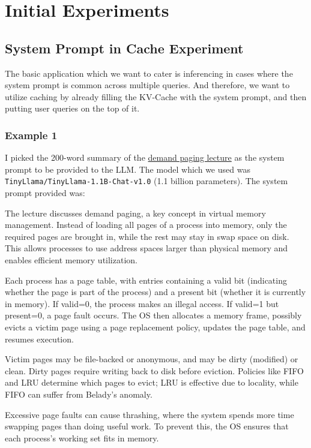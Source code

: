 \chapter{Initial Experiments}

\section{System Prompt in Cache Experiment}

The basic application which we want to cater is inferencing in cases where the system prompt is common across multiple queries. And therefore, we want to utilize caching by already filling the KV-Cache with the system prompt, and then putting user queries on the top of it.


\subsection{Example 1}
I picked the 200-word summary of the \href{https://www.cse.iitb.ac.in/~mythili/os/iitb_slides/demand-paging.pdf}{demand paging lecture} as the system prompt to be provided to the LLM. The model which we used was \texttt{TinyLlama/TinyLlama-1.1B-Chat-v1.0} (1.1 billion parameters). The system prompt provided was:

\begin{tcolorbox}[colback=gray!10, colframe=gray!60!black, sharp corners, boxrule=0.5pt, left=4pt, right=4pt, top=4pt, bottom=4pt]
\small
The lecture discusses demand paging, a key concept in virtual memory management. Instead of loading all pages of a process into memory, only the required pages are brought in, while the rest may stay in swap space on disk. This allows processes to use address spaces larger than physical memory and enables efficient memory utilization.

Each process has a page table, with entries containing a valid bit (indicating whether the page is part of the process) and a present bit (whether it is currently in memory). If valid=0, the process makes an illegal access. If valid=1 but present=0, a page fault occurs. The OS then allocates a memory frame, possibly evicts a victim page using a page replacement policy, updates the page table, and resumes execution.

Victim pages may be file-backed or anonymous, and may be dirty (modified) or clean. Dirty pages require writing back to disk before eviction. Policies like FIFO and LRU determine which pages to evict; LRU is effective due to locality, while FIFO can suffer from Belady’s anomaly.

Excessive page faults can cause thrashing, where the system spends more time swapping pages than doing useful work. To prevent this, the OS ensures that each process’s working set fits in memory.
\end{tcolorbox}


